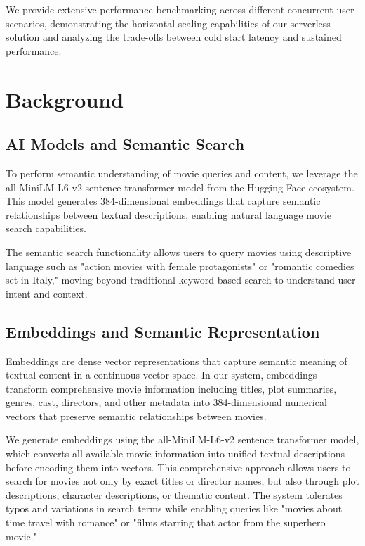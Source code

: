 \documentclass[conference]{IEEEtran}
\begin{document}
We provide extensive performance benchmarking across different concurrent user scenarios, demonstrating the horizontal scaling capabilities of our serverless solution and analyzing the trade-offs between cold start latency and sustained performance.

\section{Background}

\subsection{AI Models and Semantic Search}

To perform semantic understanding of movie queries and content, we leverage the all-MiniLM-L6-v2 sentence transformer model from the Hugging Face ecosystem. This model generates 384-dimensional embeddings that capture semantic relationships between textual descriptions, enabling natural language movie search capabilities.

The semantic search functionality allows users to query movies using descriptive language such as "action movies with female protagonists" or "romantic comedies set in Italy," moving beyond traditional keyword-based search to understand user intent and context.

\subsection{Embeddings and Semantic Representation}

Embeddings are dense vector representations that capture semantic meaning of textual content in a continuous vector space. In our system, embeddings transform comprehensive movie information including titles, plot summaries, genres, cast, directors, and other metadata into 384-dimensional numerical vectors that preserve semantic relationships between movies.

We generate embeddings using the all-MiniLM-L6-v2 sentence transformer model, which converts all available movie information into unified textual descriptions before encoding them into vectors. This comprehensive approach allows users to search for movies not only by exact titles or director names, but also through plot descriptions, character descriptions, or thematic content. The system tolerates typos and variations in search terms while enabling queries like "movies about time travel with romance" or "films starring that actor from the superhero movie."
\end{document}
